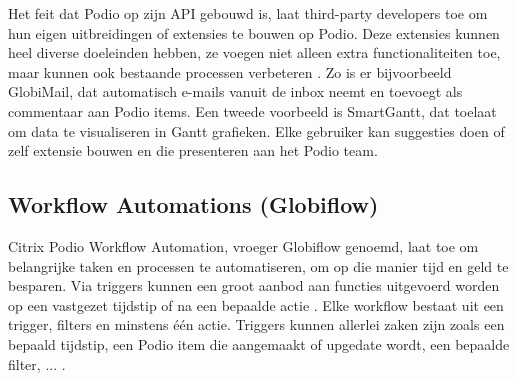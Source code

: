 
Het feit dat Podio op zijn API gebouwd is, laat third-party developers toe om hun eigen uitbreidingen of extensies te bouwen op Podio. Deze extensies kunnen heel diverse doeleinden hebben, ze voegen niet alleen extra functionaliteiten toe, maar kunnen ook bestaande processen verbeteren \autocite{PodioExtensions}. Zo is er bijvoorbeeld GlobiMail, dat automatisch e-mails vanuit de inbox neemt en toevoegt als commentaar aan Podio items. Een tweede voorbeeld is SmartGantt, dat toelaat om data te visualiseren in Gantt grafieken. Elke gebruiker kan suggesties doen of zelf extensie bouwen en die presenteren aan het Podio team. \\



\subsection{Workflow Automations (Globiflow)}
\label{subsec:workflow_automations}

Citrix Podio Workflow Automation, vroeger Globiflow genoemd, laat toe om belangrijke taken en processen te automatiseren, om op die manier tijd en geld te besparen. Via triggers kunnen een groot aanbod aan functies uitgevoerd worden op een vastgezet tijdstip of na een bepaalde actie \autocite{PodioWorkflowAutomation}. Elke workflow bestaat uit een trigger, filters en minstens één actie. Triggers kunnen allerlei zaken zijn zoals een bepaald tijdstip, een Podio item die aangemaakt of upgedate wordt, een bepaalde filter, ... \autocite{PodioWorkflowFeatures}. \\

